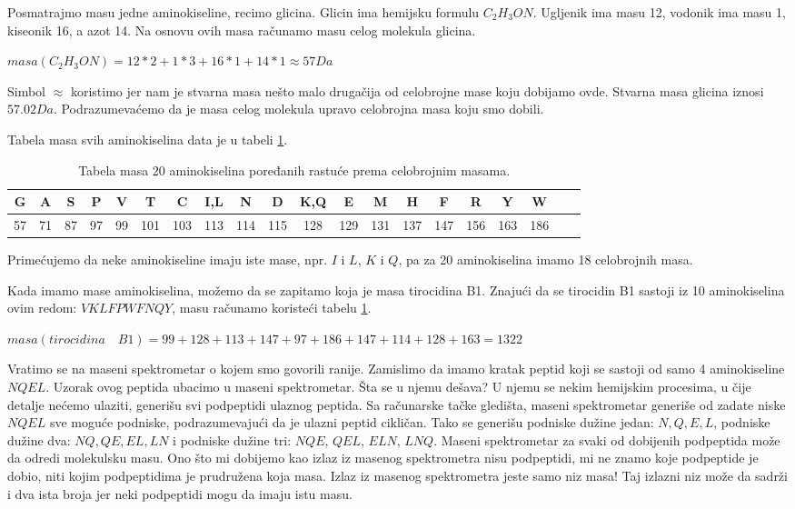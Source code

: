 Posmatrajmo masu jedne aminokiseline, recimo glicina. Glicin ima hemijsku formulu $ C_{2}H_{3}ON $. Ugljenik ima masu 12, vodonik ima masu 1, kiseonik 16, a azot 14. Na osnovu ovih masa računamo masu celog molekula glicina.
\begin{center}
$  masa(C_{2}H_{3}ON) = 12*2 + 1*3 + 16*1 + 14*1 \approx 57 Da $
\end{center}

\noindent Simbol  $ \approx $ koristimo jer nam je stvarna masa nešto malo drugačija od celobrojne mase koju dobijamo ovde. Stvarna masa glicina iznosi $ 57.02 Da $. Podrazumevaćemo da je masa celog molekula upravo celobrojna masa koju smo dobili.

Tabela masa svih aminokiselina data je u tabeli \ref{tabela:mase}.

\begin{center}
\begin{table} [h!]
\centering
\caption{Tabela masa 20 aminokiselina poređanih rastuće prema celobrojnim masama.}
\label{tabela:mase}
\begin{tabular}{ |c|c|c|c|c|c|c|c|c|c|c|c|c|c|c|c|c|c|c|c| } 
 \hline
 G & A & S & P & V & T & C & I,L & N &  D & K,Q & E & M & H & F & R & Y & W\\ 
 \hline 
 57 & 71 & 87 & 97 & 99 & 101 & 103 & 113 & 114 & 115 & 128 & 129 & 131 & 137 & 147 & 156 & 163 & 186 \\ 
 \hline
\end{tabular}
\end{table}
\end{center}

Primećujemo da neke aminokiseline imaju iste mase, npr. $I$ i $L$, $K$ i $Q$, pa za 20 aminokiselina imamo 18 celobrojnih masa.

Kada imamo mase aminokiselina, možemo da se zapitamo koja je masa tirocidina B1. Znajući da se tirocidin B1 sastoji iz 10 aminokiselina ovim redom: $ VKLFPWFNQY $, masu računamo koristeći tabelu \ref{tabela:mase}. 

\begin{center}
$  masa(tirocidina \quad B1) = 99+128+113+147+97+186+147+114+128+163 = 1322 $
\end{center}

Vratimo se na maseni spektrometar o kojem smo govorili ranije. Zamislimo da imamo kratak peptid koji se sastoji od samo 4 aminokiseline $NQEL$. Uzorak ovog peptida ubacimo u maseni spektrometar. Šta se u njemu dešava? U njemu se nekim hemijskim procesima, u čije detalje nećemo ulaziti, generišu svi podpeptidi ulaznog peptida. Sa računarske tačke gledišta, maseni spektrometar generiše od zadate niske $NQEL$ sve moguće podniske, podrazumevajući da je ulazni peptid cikličan. Tako se generišu podniske dužine jedan: $N, Q, E, L$, podniske dužine dva: $NQ, QE, EL, LN$ i podniske dužine tri: $NQE$, $QEL$, $ELN$, $LNQ$. Maseni spektrometar za svaki od dobijenih podpeptida može da odredi molekulsku masu. Ono što mi dobijemo kao izlaz iz masenog spektrometra nisu podpeptidi, mi ne znamo koje podpeptide je dobio, niti kojim podpeptidima je prudružena koja masa. Izlaz iz masenog spektrometra jeste samo niz masa! Taj izlazni niz može da sadrži i dva ista broja jer neki podpeptidi mogu da imaju istu masu.

